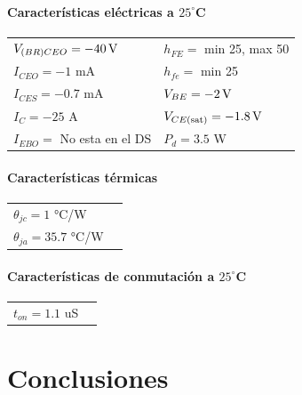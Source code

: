 \documentclass[chaptersright]{informeutn}
\begin{document}
    \subsubsection{Características eléctricas a $25^\circ$C}
    \begin{tabular}{ll}
    $V_{(BR)CEO} = -40 \,\mathrm{V}$         & \hspace{2cm} $h_{FE} =$ min 25, max 50 \\
    $I_{CEO} = -1$ mA            & \hspace{2cm} $h_{fe} = $ min 25  \\
    $I_{CES} = -0.7$ mA               & \hspace{2cm} $V_{BE} = -2 \,\mathrm{V} $\\
    $I_C = -25$ A                & \hspace{2cm} $V_{CE(\text{sat})} = -1.8 \,\mathrm{V} $ \\
    $I_{EBO} = $ No esta en el DS              & \hspace{2cm} $P_d = 3.5$ W \\
    \end{tabular}
    
    \subsubsection{Características térmicas}
    \begin{tabular}{ll}
    $\theta_{jc} = 1$ °C/W \\
    $\theta_{ja} = 35.7$ °C/W \\
    \end{tabular}
    
    \subsubsection{Características de conmutación a $25^\circ$C}
    \begin{tabular}{ll}
    $t_{on} = 1.1$ uS  \\
    \end{tabular}



\chapter{Conclusiones}
\end{document}

